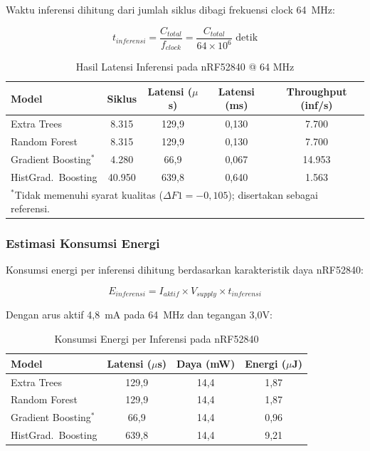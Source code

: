 Waktu inferensi dihitung dari jumlah siklus dibagi frekuensi clock 64~MHz:

\begin{equation}
    t_{inferensi} = \frac{C_{total}}{f_{clock}} = \frac{C_{total}}{64 \times 10^6} \text{ detik}
\end{equation}

\begin{table}[htbp]
\centering
\caption{Hasil Latensi Inferensi pada nRF52840 @ 64 MHz}
\label{tab:arm_latency}
\begin{tabular}{lcccc}
\hline
\textbf{Model} & \textbf{Siklus} & \textbf{Latensi ($\mu$s)} & \textbf{Latensi (ms)} & \textbf{Throughput (inf/s)} \\
\hline
Extra Trees & 8.315 & 129,9 & 0,130 & 7.700 \\
Random Forest & 8.315 & 129,9 & 0,130 & 7.700 \\
Gradient Boosting$^{*}$ & 4.280 & 66,9 & 0,067 & 14.953 \\
HistGrad.\ Boosting & 40.950 & 639,8 & 0,640 & 1.563 \\
\hline
\multicolumn{5}{l}{\footnotesize $^{*}$Tidak memenuhi syarat kualitas ($\Delta F1 = -0{,}105$); disertakan sebagai referensi.}
\end{tabular}
\end{table}

\subsubsection{Estimasi Konsumsi Energi}

Konsumsi energi per inferensi dihitung berdasarkan karakteristik daya nRF52840:

\begin{equation}
    E_{inferensi} = I_{aktif} \times V_{supply} \times t_{inferensi}
\end{equation}

Dengan arus aktif 4,8~mA pada 64~MHz dan tegangan 3,0V:

\begin{table}[htbp]
\centering
\caption{Konsumsi Energi per Inferensi pada nRF52840}
\label{tab:arm_energy}
\begin{tabular}{lccc}
\hline
\textbf{Model} & \textbf{Latensi ($\mu$s)} & \textbf{Daya (mW)} & \textbf{Energi ($\mu$J)} \\
\hline
Extra Trees & 129,9 & 14,4 & 1,87 \\
Random Forest & 129,9 & 14,4 & 1,87 \\
Gradient Boosting$^{*}$ & 66,9 & 14,4 & 0,96 \\
HistGrad.\ Boosting & 639,8 & 14,4 & 9,21 \\
\hline
\end{tabular}
\end{table}

